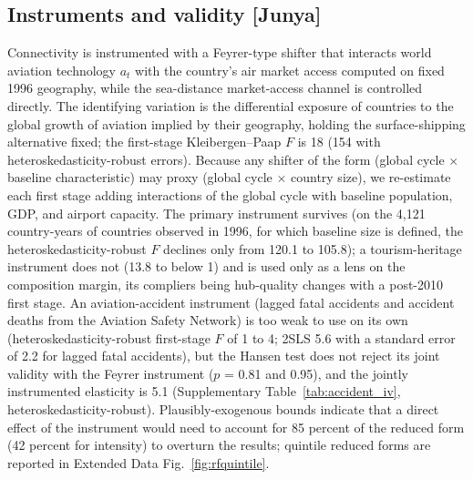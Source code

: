 \documentclass[12pt]{article}
\begin{document}
\subsection*{Instruments and validity [Junya]}
Connectivity is instrumented with a Feyrer-type shifter that interacts
world aviation technology $a_t$ with the country's air market access
computed on fixed 1996 geography, while the sea-distance market-access
channel is controlled directly. The identifying variation is the
differential exposure of countries to the global growth of aviation implied
by their geography, holding the surface-shipping alternative fixed; the
first-stage Kleibergen--Paap $F$ is 18 (154 with heteroskedasticity-robust
errors). Because any shifter of the form
(global cycle $\times$ baseline characteristic) may proxy (global cycle
$\times$ country size), we re-estimate each first stage adding interactions
of the global cycle with baseline population, GDP, and airport capacity.
The primary instrument survives (on the 4,121 country-years of countries
observed in 1996, for which baseline size is defined, the
heteroskedasticity-robust $F$ declines only from 120.1 to 105.8);
a tourism-heritage instrument does not (13.8 to below 1) and is used only
as a lens on the composition margin, its compliers being hub-quality
changes with a post-2010 first stage. An aviation-accident instrument
(lagged fatal accidents and accident deaths from the Aviation Safety
Network) is too weak to use on its own (heteroskedasticity-robust
first-stage $F$ of 1 to 4; 2SLS 5.6 with a standard error of 2.2 for
lagged fatal accidents), but the Hansen test does not reject its joint
validity with the Feyrer instrument ($p$ = 0.81 and 0.95), and the jointly
instrumented elasticity is 5.1 (Supplementary
Table~\ref{tab:accident_iv}, heteroskedasticity-robust). Plausibly-exogenous bounds indicate that a direct
effect of the instrument would need to account for 85 percent of the
reduced form (42 percent for intensity) to overturn the results; quintile
reduced forms are reported in Extended Data Fig.~\ref{fig:rfquintile}.
\end{document}

